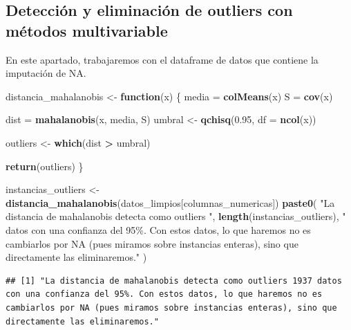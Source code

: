 \documentclass[notspecified,article,submit,moreauthors,pdftex]{Definitions/mdpi}
\newenvironment{Shaded}{\begin{snugshade}}{\end{snugshade}}
\newcommand{\AttributeTok}[1]{\textcolor[rgb]{0.13,0.29,0.53}{#1}}
\newcommand{\ControlFlowTok}[1]{\textcolor[rgb]{0.13,0.29,0.53}{\textbf{#1}}}
\newcommand{\FloatTok}[1]{\textcolor[rgb]{0.00,0.00,0.81}{#1}}
\newcommand{\FunctionTok}[1]{\textcolor[rgb]{0.13,0.29,0.53}{\textbf{#1}}}
\newcommand{\NormalTok}[1]{#1}
\newcommand{\OtherTok}[1]{\textcolor[rgb]{0.56,0.35,0.01}{#1}}
\newcommand{\SpecialCharTok}[1]{\textcolor[rgb]{0.81,0.36,0.00}{\textbf{#1}}}
\newcommand{\StringTok}[1]{\textcolor[rgb]{0.31,0.60,0.02}{#1}}
\begin{document}
\hypertarget{detecciuxf3n-y-eliminaciuxf3n-de-outliers-con-muxe9todos-multivariable}{%
\subsection{Detección y eliminación de outliers con métodos
multivariable}\label{detecciuxf3n-y-eliminaciuxf3n-de-outliers-con-muxe9todos-multivariable}}

En este apartado, trabajaremos con el dataframe de datos que contiene la
imputación de NA.

\begin{Shaded}
\begin{Highlighting}[]
\NormalTok{distancia\_mahalanobis }\OtherTok{\textless{}{-}} \ControlFlowTok{function}\NormalTok{(x) \{}
\NormalTok{  media }\OtherTok{=} \FunctionTok{colMeans}\NormalTok{(x)}
\NormalTok{  S }\OtherTok{=} \FunctionTok{cov}\NormalTok{(x)}
  
\NormalTok{  dist }\OtherTok{=} \FunctionTok{mahalanobis}\NormalTok{(x, media, S)}
\NormalTok{  umbral }\OtherTok{\textless{}{-}} \FunctionTok{qchisq}\NormalTok{(}\FloatTok{0.95}\NormalTok{, }\AttributeTok{df =} \FunctionTok{ncol}\NormalTok{(x))}
  
\NormalTok{  outliers }\OtherTok{\textless{}{-}} \FunctionTok{which}\NormalTok{(dist }\SpecialCharTok{\textgreater{}}\NormalTok{ umbral)}
  
  \FunctionTok{return}\NormalTok{(outliers)}
\NormalTok{\}}

\NormalTok{instancias\_outliers }\OtherTok{\textless{}{-}}
  \FunctionTok{distancia\_mahalanobis}\NormalTok{(datos\_limpios[columnas\_numericas])}
\FunctionTok{paste0}\NormalTok{(}
  \StringTok{"La distancia de mahalanobis detecta como outliers "}\NormalTok{,}
  \FunctionTok{length}\NormalTok{(instancias\_outliers),}
  \StringTok{" datos con una confianza del 95\%. Con estos datos, lo que haremos no es cambiarlos por NA (pues miramos sobre instancias enteras), sino que directamente las eliminaremos."}
\NormalTok{)}
\end{Highlighting}
\end{Shaded}

\begin{verbatim}
## [1] "La distancia de mahalanobis detecta como outliers 1937 datos con una confianza del 95%. Con estos datos, lo que haremos no es cambiarlos por NA (pues miramos sobre instancias enteras), sino que directamente las eliminaremos."
\end{verbatim}
\end{document}

